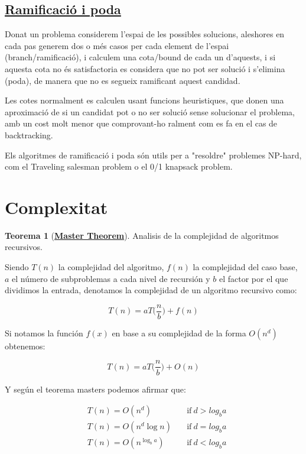 \documentclass[12pt]{article}
\theoremstyle{definition}
\theoremstyle{definition}
\theoremstyle{definition}
\theoremstyle{definition}
\theoremstyle{definition}
\theoremstyle{definition}
\newtheorem{teo}{Teorema}
\theoremstyle{definition}
\begin{document}
\subsection{\href{https://en.wikipedia.org/wiki/Branch_and_bound}{Ramificació i poda}}

Donat un problema considerem l'espai de les possibles solucions, aleshores en cada pas generem dos o més casos per cada element de l'espai (branch/ramificació), i calculem una cota/bound de cada un d'aquests, i si aquesta cota no és satisfactoria es considera que no pot ser solució i s'elimina (poda), de manera que no es segueix ramificant aquest candidad.

Les cotes normalment es calculen usant funcions heuristiques, que donen una aproximació de si un candidat pot o no ser solució sense solucionar el problema, amb un cost molt menor que comprovant-ho ralment com es fa en el cas de backtracking.

Els algoritmes de ramificació i poda són utils per a "resoldre" problemes NP-hard, com el Traveling salesman problem o el 0/1 knapsack problem.


\newpage

\section{Complexitat}

\begin{teo}[\href{https://en.wikipedia.org/wiki/Master_theorem_(analysis_of_algorithms)}{\textbf{Master Theorem}}]
Analisis de la complejidad de algoritmos recursivos.

Siendo $T(n)$ la complejidad del algoritmo, $f(n)$ la complejidad del caso base, $a$ el número de subproblemas a cada nivel de recursión y $b$ el factor por el que dividimos la entrada, denotamos la complejidad de un algoritmo recursivo como:

\[
T(n) = aT\big(\frac{n}{b}\big)+f(n)
\]

Si notamos la función $f(x)$ en base a su complejidad de la forma $O(n^d)$ obtenemos:

\[
T(n) = aT\big(\frac{n}{b}\big)+O(n)
\]

Y según el teorema masters podemos afirmar que:

\begin{equation*}
\begin{aligned}
	& T(n)=O(n^d) \quad & \textrm{if}\: d>log_b a\\
	& T(n)=O(n^d\log n) \quad & \textrm{if}\: d=log_b a\\
	& T(n)=O(n^{\log_b{a}}) \quad & \textrm{if}\: d<log_b a
\end{aligned}
\end{equation*}
\end{teo}
\end{document}
